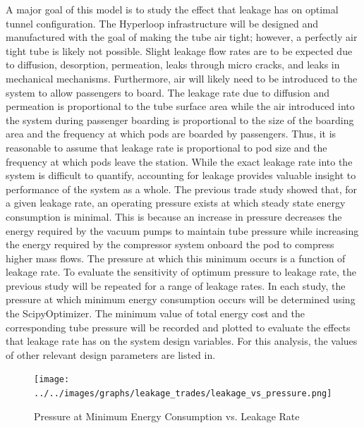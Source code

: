A major goal of this model is to study the effect that leakage has on optimal
tunnel configuration. The Hyperloop infrastructure will be designed and
manufactured with the goal of making the tube air tight; however, a perfectly
air tight tube is likely not possible. Slight leakage flow rates are to be
expected due to diffusion, desorption, permeation, leaks through micro cracks,
and leaks in mechanical mechanisms. Furthermore, air will likely need to be
introduced to the system to allow passengers to board. The leakage rate due to
diffusion and permeation is proportional to the tube surface area while the air
introduced into the system during passenger boarding is proportional to the
size of the boarding area and the frequency at which pods are boarded by passengers.
Thus, it is reasonable to assume that leakage rate is proportional to pod size
and the frequency at which pods leave the station. While the exact leakage rate
into the system is difficult to quantify, accounting for leakage provides
valuable insight to performance of the system as a whole.
The previous trade study showed that, for a given leakage rate, an operating
pressure exists at which steady state energy consumption is minimal.
This is because an increase in pressure decreases the energy required by the
vacuum pumps to maintain tube pressure while increasing the energy required by
the compressor system onboard the pod to compress higher mass flows.
The pressure at which this minimum occurs is a function of leakage rate.
To evaluate the sensitivity of optimum pressure to leakage rate, the previous
study will be repeated for a range of leakage rates. In each study, the
pressure at which minimum energy consumption occurs will be determined using
the ScipyOptimizer. The minimum value of total energy cost and the
corresponding tube pressure will be recorded and plotted to evaluate the
effects that leakage rate has on the system design variables.
For this analysis, the values of other relevant design parameters are listed in.
\begin{figure}
	\centering
	\texttt{[image: ../../images/graphs/leakage\_trades/leakage\_vs\_pressure.png]}
	\caption{Pressure at Minimum Energy Consumption vs. Leakage Rate}
	\label{fig:pres_vs_leakage_rate}
\end{figure}

